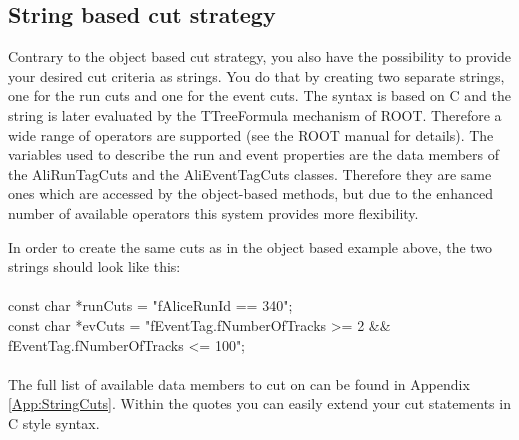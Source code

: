 \subsection{String based cut strategy}
Contrary to the object based cut strategy, you also have the possibility to provide your desired cut criteria as strings. You do that by creating two separate strings, one for the run cuts and one for the event cuts. The syntax is based on C and the string is later evaluated by the TTreeFormula mechanism of ROOT. Therefore a wide range of operators are supported (see the ROOT manual \cite{Note:ROOTManual} for details). The variables used to describe the run and event properties are the data members of the {\ttfamily AliRunTagCuts} and the {\ttfamily AliEventTagCuts} classes. Therefore they are same ones which are accessed by the object-based methods, but due to the enhanced number of available operators this system provides more flexibility.

In order to create the same cuts as in the object based example above, the two strings should look like this:\\
\\
{\ttfamily const char *runCuts = "fAliceRunId == 340";}\\
{\ttfamily const char *evCuts = "fEventTag.fNumberOfTracks >= 2 \&\&\\
fEventTag.fNumberOfTracks <= 100";}\\
\\
The full list of available data members to cut on can be found in Appendix\,\ref{App:StringCuts}. Within the quotes you can easily extend your cut statements in C style syntax.

